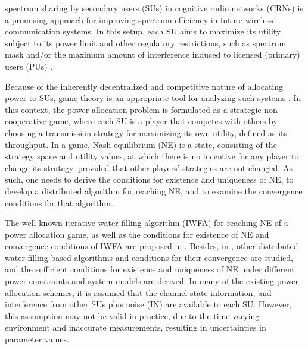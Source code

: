 \documentclass[peerreview,onecolumn,11pt,draftclsnofoot]{IEEEtran}\usepackage{amsmath}\usepackage{amsfonts}\usepackage{epsfig}\usepackage{amssymb}\usepackage{graphicx}\usepackage{amssymb,amsmath}\usepackage{cite}\usepackage{color,soul}\newcommand\T{\rule{0pt}{3.1ex}}
\begin{document}
 spectrum sharing by secondary users (SUs) in cognitive radio networks (CRNs) is a promising approach for improving spectrum efficiency in future wireless communication systems. In this setup, each SU aims to maximize its utility subject to its power limit and other regulatory restrictions, such as spectrum mask and/or the maximum amount of interference induced to licensed (primary) users (PUs) \cite{Haykin,Goldsmith}.

Because of the inherently decentralized and competitive nature of allocating power to SUs, game theory is an appropriate tool for analyzing such systems \cite{MIMOcognitivescutari,Robusthaykin,ScutariVI,ProbabilisticIWFA,Robustnew}. In this context, the power allocation problem is formulated as a strategic non-cooperative game, where each SU is a player that competes with others by choosing a transmission strategy for maximizing its own utility, defined as its throughput. In a game, Nash equilibrium (NE) is a state, consisting of the strategy space and utility values, at which there is no incentive for any player to change its strategy, provided that other players' strategies are not changed. As such, one needs to derive the conditions for existence and uniqueness of NE, to develop a distributed algorithm for reaching NE, and to examine the convergence conditions for that algorithm.

The well known iterative water-filling algorithm (IWFA) for
reaching NE of a power allocation game, as well as the conditions for existence of NE and convergence conditions of IWFA are proposed in \cite{Yu}. Besides, in \cite{MIMOcognitivescutari, ScutariVI, scutari5,Luo1, Luo2, Nash1, Nash2,SimultanousWFA,Spectrumsharing}, other distributed water-filling based algorithms and conditions for their convergence are studied, and the sufficient conditions for existence and uniqueness of NE under different power constraints and system models are derived. In many of the existing power allocation schemes, it is assumed that the channel state information, and interference from other SUs plus noise (IN) are available to each SU. However, this assumption may not be valid in practice, due to the time-varying environment and inaccurate measurements, resulting in uncertainties in parameter values.
\end{document}
